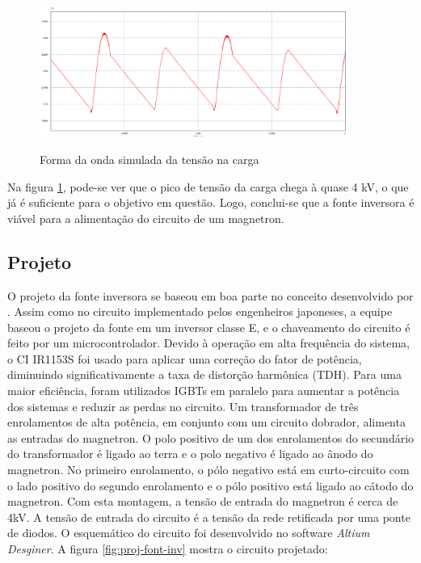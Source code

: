 \begin{figure}[!htb]
    \centering
    \caption{Forma da onda simulada da tensão na carga}
    \includegraphics[width=0.9\textwidth]{./dados/figuras/psim2}
    \label{fig:figura-graf_sim_1}
\end{figure}

Na figura \ref{fig:figura-graf_sim_1}, pode-se ver que o pico de tensão da carga chega à quase 4 kV, o que já é suficiente para o objetivo em questão. Logo, conclui-se que a fonte inversora é viável para a alimentação do circuito de um magnetron.

\subsection{Projeto}

O projeto da fonte inversora se baseou em boa parte no conceito desenvolvido por . Assim como no circuito implementado pelos engenheiros japoneses, a equipe baseou o projeto da fonte em um inversor classe E, e o chaveamento do circuito é feito por um microcontrolador. Devido à operação em alta frequência do sistema, o CI IR1153S foi usado para aplicar uma correção do fator de potência, diminuindo significativamente a taxa de distorção harmônica (TDH). Para uma maior eficiência, foram utilizados IGBTs em paralelo para aumentar a potência dos sistemas e reduzir as perdas no circuito. Um transformador de três enrolamentos de alta potência, em conjunto com um circuito dobrador, alimenta as entradas do magnetron. O polo positivo de um dos enrolamentos do secundário do transformador é ligado ao terra e o polo negativo é ligado ao ânodo do magnetron. No primeiro enrolamento, o pólo negativo está em curto-circuito com o lado positivo do segundo enrolamento e o pólo positivo está ligado ao cátodo do magnetron. Com esta montagem, a tensão de entrada do magnetron é cerca de 4kV. A tensão de entrada do circuito é a tensão da rede retificada por uma ponte de diodos. O esquemático do circuito foi desenvolvido no software \textit{Altium Desginer}. A figura \ref{fig:proj-font-inv} mostra o circuito projetado:

